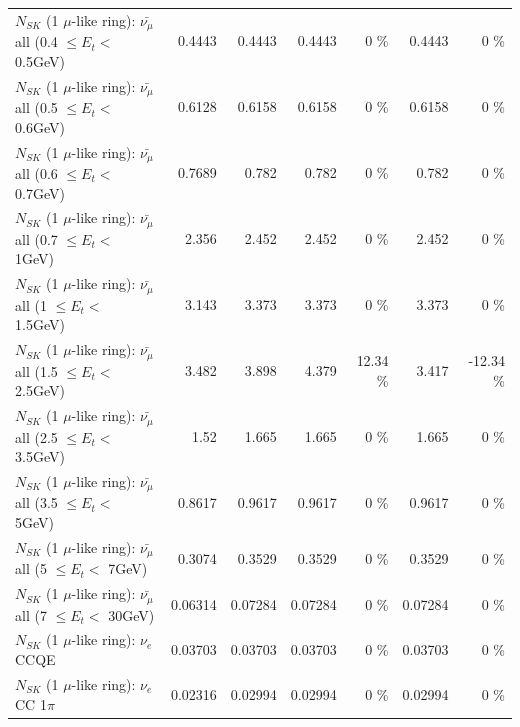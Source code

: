 \begin{table}
\begin{tabular}{| l | r | r | r  r | r  r |}
 $N_{SK}$ (1 $\mu$-like ring): $\bar{\nu_{\mu}}$ all (0.4 $\leq E_{t} <$ 0.5GeV) &          0.4443 &          0.4443 &          0.4443 &        0 \%  &          0.4443 &        0 \%  \\ 
 $N_{SK}$ (1 $\mu$-like ring): $\bar{\nu_{\mu}}$ all (0.5 $\leq E_{t} <$ 0.6GeV) &          0.6128 &          0.6158 &          0.6158 &        0 \%  &          0.6158 &        0 \%  \\ 
 $N_{SK}$ (1 $\mu$-like ring): $\bar{\nu_{\mu}}$ all (0.6 $\leq E_{t} <$ 0.7GeV) &          0.7689 &           0.782 &           0.782 &        0 \%  &           0.782 &        0 \%  \\ 
   $N_{SK}$ (1 $\mu$-like ring): $\bar{\nu_{\mu}}$ all (0.7 $\leq E_{t} <$ 1GeV) &           2.356 &           2.452 &           2.452 &        0 \%  &           2.452 &        0 \%  \\ 
   $N_{SK}$ (1 $\mu$-like ring): $\bar{\nu_{\mu}}$ all (1 $\leq E_{t} <$ 1.5GeV) &           3.143 &           3.373 &           3.373 &        0 \%  &           3.373 &        0 \%  \\ 
 $N_{SK}$ (1 $\mu$-like ring): $\bar{\nu_{\mu}}$ all (1.5 $\leq E_{t} <$ 2.5GeV) &           3.482 &           3.898 &           4.379 &    12.34 \%  &           3.417 &   -12.34 \%  \\ 
 $N_{SK}$ (1 $\mu$-like ring): $\bar{\nu_{\mu}}$ all (2.5 $\leq E_{t} <$ 3.5GeV) &            1.52 &           1.665 &           1.665 &        0 \%  &           1.665 &        0 \%  \\ 
   $N_{SK}$ (1 $\mu$-like ring): $\bar{\nu_{\mu}}$ all (3.5 $\leq E_{t} <$ 5GeV) &          0.8617 &          0.9617 &          0.9617 &        0 \%  &          0.9617 &        0 \%  \\ 
     $N_{SK}$ (1 $\mu$-like ring): $\bar{\nu_{\mu}}$ all (5 $\leq E_{t} <$ 7GeV) &          0.3074 &          0.3529 &          0.3529 &        0 \%  &          0.3529 &        0 \%  \\ 
    $N_{SK}$ (1 $\mu$-like ring): $\bar{\nu_{\mu}}$ all (7 $\leq E_{t} <$ 30GeV) &         0.06314 &         0.07284 &         0.07284 &        0 \%  &         0.07284 &        0 \%  \\ 
\hline
\hline
\hline
                                      $N_{SK}$ (1 $\mu$-like ring): $\nu_e$ CCQE &         0.03703 &         0.03703 &         0.03703 &        0 \%  &         0.03703 &        0 \%  \\ 
                                 $N_{SK}$ (1 $\mu$-like ring): $\nu_e$ CC 1$\pi$ &         0.02316 &         0.02994 &         0.02994 &        0 \%  &         0.02994 &        0 \%  \\ 

\end{tabular}
\end{table}
